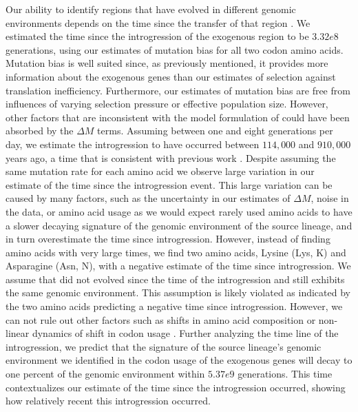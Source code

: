 \documentclass[12pt, letter]{article}
\begin{document}
Our ability to identify regions that have evolved in different genomic environments depends on the time since the transfer of that region \citep{lawrence1997}. 
We estimated the time since the introgression of the exogenous region to be $3.32e8$ generations, using our estimates of mutation bias for all two codon amino acids.
Mutation bias is well suited since, as previously mentioned, it provides more information about the exogenous genes than our estimates of selection against translation inefficiency.
Furthermore, our estimates of mutation bias are free from influences of varying selection pressure or effective population size.
However, other factors that are inconsistent with the model formulation of \ROC could have been absorbed by the $\Delta M$ terms.
Assuming between one and eight generations per day, we estimate the introgression to have occurred between $114,000$ and $910,000$ years ago, a time that is consistent with previous work \citep{friedrich2015}.
Despite assuming the same mutation rate for each amino acid we observe large variation in our estimate of the time since the introgression event.
This large variation can be caused by many factors, such as the uncertainty in our estimates of $\Delta M$, noise in the data, or amino acid usage as we would expect rarely used amino acids to have a slower decaying signature of the genomic environment of the source lineage, and in turn overestimate the time since introgression.
However, instead of finding amino acids with very large times, we find two amino acids, Lysine (Lys, K) and Asparagine (Asn, N), with a negative estimate of the time since introgression.
We assume that \gossypii did not evolved since the time of the introgression and still exhibits the same genomic environment.
This assumption is likely violated as indicated by the two amino acids predicting a negative time since introgression. 
However, we can not rule out other factors such as shifts in amino acid composition \citep{payen2009} or non-linear dynamics of shift in codon usage .
Further analyzing the time line of the introgression, we predict that the signature of the source lineage's genomic environment we identified in the codon usage of the exogenous genes will decay to one percent of the \kluyveri genomic environment within $5.37e9$ generations.
This time contextualizes our estimate of the time since the introgression occurred, showing how relatively recent this introgression occurred.
\end{document}
